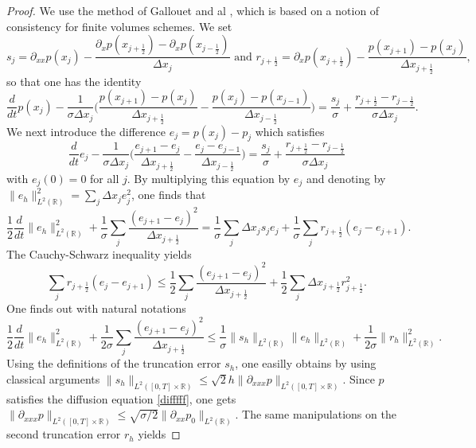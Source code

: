 \documentclass[a4paper,french,english,10pt]{article}
\begin{document}
\begin{proof}
We  use the method of Gallouet and al \cite{FV}, which
is based on  a notion of consistency for finite volumes schemes.
We set
$$
s_j=\partial_{xx}p(x_j)-\frac{\partial_xp(x_{j+\frac12}  )
-
\partial_xp(x_{j-\frac12}  )
}{\Delta x_j}
\mbox{ and }
r_{j+\frac12}=\partial_{x}p(x_{j+\frac12})-\frac{p(x_{j+1}  )
-
p(x_{j}  )
}{\Delta x_{j+\frac12}},
$$
so that one has the identity
$$
 \frac{d}{dt} p(x_j)
-\frac{1}{\sigma\Delta x_j}\bigg(\frac{p(x_{j+1})-p(x_{j})}{\Delta
x_{j+\frac12 }}-\frac{p(x_{j})-p(x_{j-1})}{\Delta
x_{j-\frac12 }}\bigg)=
\frac{s_j}\sigma+
\frac{r_{j+\frac12}-r_{j-\frac12}}{\sigma \Delta x_j}.
$$
We next  introduce the difference
$e_j=p(x_j)-p_j$ which satisfies
$$
 \frac{d}{dt} e_j
-\frac{1}{\sigma\Delta x_j}\bigg(\frac{e_{j+1}-e_{j}}{\Delta
x_{j+\frac12 }}-\frac{e_{j}-e_{j-1}}{\Delta
x_{j-\frac12 }}\bigg)=
\frac{s_j}\sigma+
\frac{r_{j+\frac12}-r_{j-\frac12}}{\sigma \Delta x_j}
$$
with $e_j(0)=0$ for all $j$.
By multiplying this equation by $e_j$
and  denoting by $\|e_h\|_{L^2(\mathbb{R})}^2= \sum_j \Delta x_je_j^2$,
one finds that 
\begin{equation*}\label{fgfg}
\frac12 \frac{d}{dt}\|e_h\|_{L^2(\mathbb{R})}^2 +\frac{1}{\sigma} \sum_j
\frac{(e_{j+1}-e_{j})^2}{\Delta
x_{j+\frac12 }}=
\frac{1}{\sigma}\sum_j \Delta x_j s_j e_j+\frac{1}{\sigma}\sum_jr_{j+\frac12 }(e_j-e_{j+1}).
\end{equation*}
The Cauchy-Schwarz inequality yields 
\begin{equation*}
\sum_jr_{j+\frac12 }(e_j-e_{j+1})\leq \frac{1}{2} \sum_j
\frac{(e_{j+1}-e_{j})^2}{\Delta x_{j+\frac12 }}+\frac{1}{2}\sum_j\Delta
x_{j+\frac12 }r_{j+\frac12 }^2.
\end{equation*}
One finds out with natural notations
\begin{equation} \label{eq:eee}
\frac12 \frac{d}{dt} \|e_h\|_{L^2(\mathbb{R})}^2+
\frac{1}{2 \sigma} \sum_j
\frac{(e_{j+1}-e_{j})^2}{\Delta x_{j+\frac12 }}\leq
\frac{1}{\sigma}\| s_h\|_{L^2(\mathbb{R})} \|e_h\|_{L^2(\mathbb{R})}+
\frac{1}{2\sigma} \|r_h\|^2_{L^2(\mathbb{R})}.
\end{equation}
Using the  definitions of  the truncation error $s_h$, one easilly obtains by using classical arguments $\|s_h\|_{L^2([0,T]\times\mathbb{R})}\leq \sqrt{2}h\|\partial_{xxx}p\|_{L^2([0,T]\times\mathbb{R})}$. Since $p$ satisfies the diffusion equation \eqref{difffff}, one gets $\|\partial_{xxx}p\|_{L^2([0,T]\times\mathbb{R})} \leq \sqrt{\sigma/2} \|\partial_{xx}p_0\|_{L^2(\mathbb{R})}$. The same manipulations on the second truncation error $r_h$ yields

\end{proof}
\end{document}
